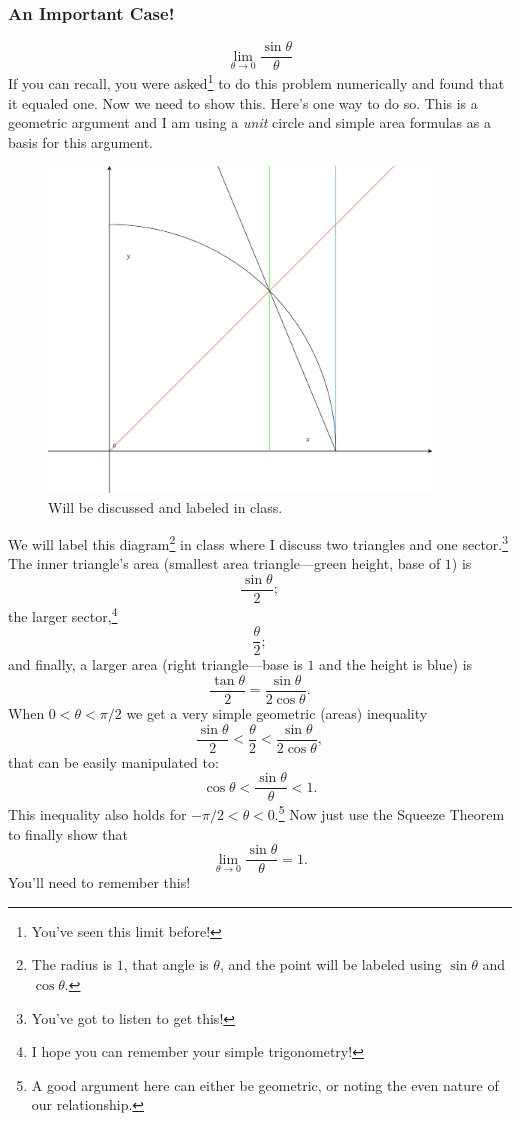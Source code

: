 \documentclass[12pt,addpoints, answers, fleqn]{exam}
\begin{document}
\subsubsection{An Important Case!}
\[
\mathop {\lim }\limits_{ \theta \to 0} \frac{\sin \theta }{\theta}
\]
If you can recall, you were asked\footnote{You've seen this limit before!} to do this problem numerically and found that it equaled one. Now we need to show this. Here's one way to do so. This is a geometric argument and I am using a \emph{unit} circle and simple area formulas as a basis for this argument.
\begin{figure}[htbp] %
   \centering
   \includegraphics[width=4in]{./graphics/graph0603.pdf} 
   \caption{Will be discussed and labeled in class.}
   \label{fig:graph0603}
\end{figure}
We will label this diagram\footnote{The radius is $1$, that angle is $\theta$, and the point will be labeled using $\sin \theta$ and $\cos \theta$.} in class where I discuss two triangles and one sector.\footnote{You've got to listen to get this!} The inner triangle's area (smallest area triangle---green height, base of $1$) is
\[
\frac{\sin \theta}{2};
\]
the larger sector,\footnote{I hope you can remember your simple trigonometry!}
\[
\frac{\theta}{2};
\]
and finally, a larger area (right triangle---base is $1$ and the height is blue) is
\[
\frac{\tan \theta}{2} = \frac{\sin \theta}{2 \cos \theta}.
\]
When  $0 < \theta < \pi/2$ we get a very simple geometric (areas) inequality
\[
\frac{\sin \theta}{2} < \frac{\theta}{2} < \frac{\sin \theta}{2 \cos \theta},
\]
that can be easily manipulated to:
\[
\cos \theta < \frac{\sin \theta}{\theta} < 1.
\]
This inequality also holds for $-\pi/2 < \theta < 0$.\footnote{A good argument here can either be geometric, or noting  the even nature of our relationship.}
Now just use the Squeeze Theorem to finally show that
\[
\mathop {\lim }\limits_{ \theta \to 0} \frac{\sin \theta }{\theta} = 1.
\]
You'll need to remember this!
\end{document}
